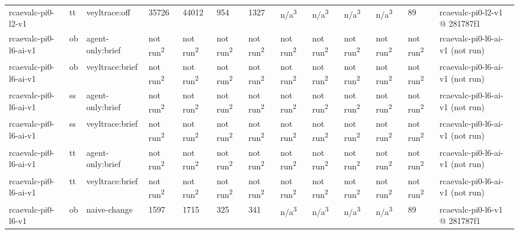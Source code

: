 \begin{table}[t]
\begin{tabular}{lllllllllllll}
rcaevalc-pi0-l2-v1 & tt & veyltrace:off & 35726 & 44012 & 954 & 1327 & n/a\textsuperscript{3} & n/a\textsuperscript{3} & n/a\textsuperscript{3} & n/a\textsuperscript{3} & 89 & rcaevalc-pi0-l2-v1 @ 281787f1 \\
rcaevalc-pi0-l6-ai-v1 & ob & agent-only:brief & not run\textsuperscript{2} & not run\textsuperscript{2} & not run\textsuperscript{2} & not run\textsuperscript{2} & not run\textsuperscript{2} & not run\textsuperscript{2} & not run\textsuperscript{2} & not run\textsuperscript{2} & not run\textsuperscript{2} & rcaevalc-pi0-l6-ai-v1 (not run) \\
rcaevalc-pi0-l6-ai-v1 & ob & veyltrace:brief & not run\textsuperscript{2} & not run\textsuperscript{2} & not run\textsuperscript{2} & not run\textsuperscript{2} & not run\textsuperscript{2} & not run\textsuperscript{2} & not run\textsuperscript{2} & not run\textsuperscript{2} & not run\textsuperscript{2} & rcaevalc-pi0-l6-ai-v1 (not run) \\
rcaevalc-pi0-l6-ai-v1 & ss & agent-only:brief & not run\textsuperscript{2} & not run\textsuperscript{2} & not run\textsuperscript{2} & not run\textsuperscript{2} & not run\textsuperscript{2} & not run\textsuperscript{2} & not run\textsuperscript{2} & not run\textsuperscript{2} & not run\textsuperscript{2} & rcaevalc-pi0-l6-ai-v1 (not run) \\
rcaevalc-pi0-l6-ai-v1 & ss & veyltrace:brief & not run\textsuperscript{2} & not run\textsuperscript{2} & not run\textsuperscript{2} & not run\textsuperscript{2} & not run\textsuperscript{2} & not run\textsuperscript{2} & not run\textsuperscript{2} & not run\textsuperscript{2} & not run\textsuperscript{2} & rcaevalc-pi0-l6-ai-v1 (not run) \\
rcaevalc-pi0-l6-ai-v1 & tt & agent-only:brief & not run\textsuperscript{2} & not run\textsuperscript{2} & not run\textsuperscript{2} & not run\textsuperscript{2} & not run\textsuperscript{2} & not run\textsuperscript{2} & not run\textsuperscript{2} & not run\textsuperscript{2} & not run\textsuperscript{2} & rcaevalc-pi0-l6-ai-v1 (not run) \\
rcaevalc-pi0-l6-ai-v1 & tt & veyltrace:brief & not run\textsuperscript{2} & not run\textsuperscript{2} & not run\textsuperscript{2} & not run\textsuperscript{2} & not run\textsuperscript{2} & not run\textsuperscript{2} & not run\textsuperscript{2} & not run\textsuperscript{2} & not run\textsuperscript{2} & rcaevalc-pi0-l6-ai-v1 (not run) \\
rcaevalc-pi0-l6-v1 & ob & naive-change & 1597 & 1715 & 325 & 341 & n/a\textsuperscript{3} & n/a\textsuperscript{3} & n/a\textsuperscript{3} & n/a\textsuperscript{3} & 89 & rcaevalc-pi0-l6-v1 @ 281787f1 \\

\end{tabular}
\end{table}
